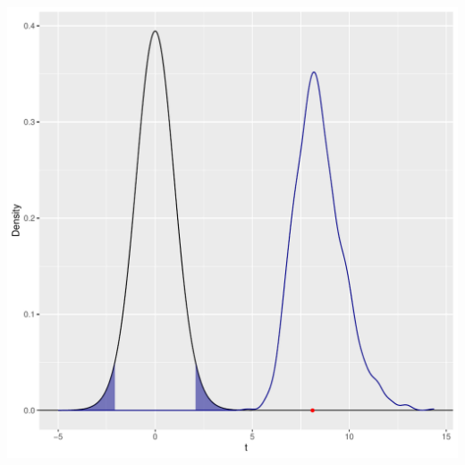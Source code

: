 \documentclass{article}\usepackage[]{graphicx}\usepackage[]{xcolor}
\makeatletter
\def\maxwidth{ %
  \ifdim\Gin@nat@width>\linewidth
    \linewidth
  \else
    \Gin@nat@width
  \fi
}
\newenvironment{knitrout}{}{} %
\makeatother
\begin{document}
\begin{enumerate}
\begin{enumerate}
\begin{knitrout}
\includegraphics[width=\maxwidth]{figure/unnamed-chunk-10-1} 
\end{knitrout}
\end{enumerate}
\end{enumerate}



\end{document}
